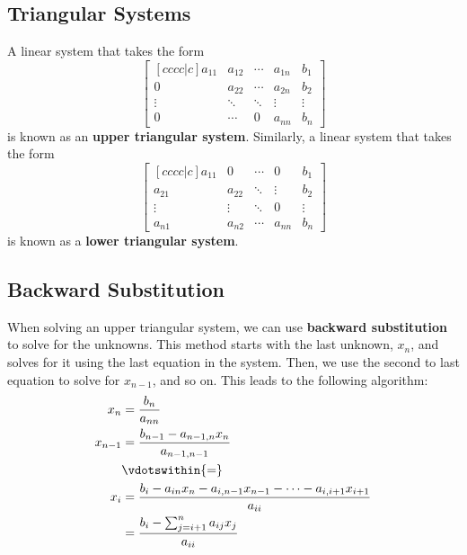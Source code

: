 \documentclass{article}
\begin{document}
\subsection{Triangular Systems}
A linear system that takes the form
\begin{equation*}
    \begin{bmatrix}[cccc|c]
        a_{11} & a_{12} & \cdots & a_{1n} & b_1    \\
        0      & a_{22} & \cdots & a_{2n} & b_2    \\
        \vdots & \ddots & \ddots & \vdots & \vdots \\
        0      & \cdots & 0      & a_{nn} & b_n
    \end{bmatrix}
\end{equation*}
is known as an \textbf{upper triangular system}. Similarly, a linear
system that takes the form
\begin{equation*}
    \begin{bmatrix}[cccc|c]
        a_{11} & 0      & \cdots & 0      & b_1    \\
        a_{21} & a_{22} & \ddots & \vdots & b_2    \\
        \vdots & \vdots & \ddots & 0      & \vdots \\
        a_{n1} & a_{n2} & \cdots & a_{nn} & b_n
    \end{bmatrix}
\end{equation*}
is known as a \textbf{lower triangular system}.
\subsection{Backward Substitution}
When solving an upper triangular system, we can use \textbf{backward
substitution} to solve for the unknowns. This method starts with the
last unknown, \(x_n\), and solves for it using the last equation in the
system. Then, we use the second to last equation to solve for \(x_{n -
1}\), and so on. This leads to the following algorithm:
\begin{align*}
    x_n       & = \frac{b_n}{a_{nn}}                                                                         \\
    x_{n - 1} & = \frac{b_{n - 1} - a_{n - 1, n} x_n}{a_{n - 1, n - 1}}                                      \\
              & \vdotswithin{=}                                                                              \\
    x_i       & = \frac{b_i - a_{in} x_n - a_{i, n - 1} x_{n - 1} - \cdots - a_{i, i + 1} x_{i + 1}}{a_{ii}} \\
              & = \frac{b_i - \sum_{j = i + 1}^n a_{ij} x_j}{a_{ii}}                                         \\
\end{align*}
\end{document}
